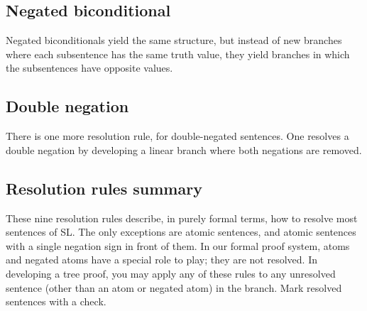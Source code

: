 
\subsection{Negated biconditional}
\begin{groupitems}
Negated biconditionals yield the same structure, but instead of new branches where each subsentence has the same truth value, they yield branches in which the subsentences have opposite values.

\end{groupitems}

\subsection{Double negation}

There is one more resolution rule, for double-negated sentences. One resolves a double negation by developing a linear branch where both negations are removed.

\label{SL.treerules.end}
\subsection{Resolution rules summary}

These nine resolution rules describe, in purely formal terms, how to resolve most sentences of SL. The only exceptions are atomic sentences, and atomic sentences with a single negation sign in front of them. In our formal proof system, atoms and negated atoms have a special role to play; they are not resolved. In developing a tree proof, you may apply any of these rules to any unresolved sentence (other than an atom or negated atom) in the branch. Mark resolved sentences with a check.

